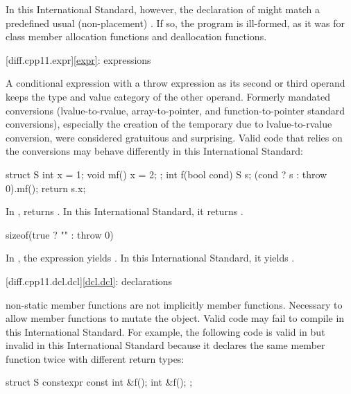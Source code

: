 In this International Standard, however, the declaration of 
might match a predefined usual (non-placement)
. If so, the
program is ill-formed, as it was for class member allocation functions and
deallocation functions.

[diff.cpp11.expr]{\ref{expr}: expressions}

\change
A conditional expression with a throw expression as its second or third
operand keeps the type and value category of the other operand.
\rationale
Formerly mandated conversions (lvalue-to-rvalue,
array-to-pointer, and function-to-pointer
standard conversions), especially the creation of the temporary due to
lvalue-to-rvalue conversion, were considered gratuitous and surprising.
\effect
Valid \CppXI{} code that relies on the conversions may behave differently
in this International Standard:

\begin{codeblock}
struct S {
  int x = 1;
  void mf() { x = 2; }
};
int f(bool cond) {
  S s;
  (cond ? s : throw 0).mf();
  return s.x;
}
\end{codeblock}

In \CppXI{},  returns . In this International Standard,
it returns .

\begin{codeblock}
sizeof(true ? "" : throw 0)
\end{codeblock}

In \CppXI{}, the expression yields . In this
International Standard, it yields .

[diff.cpp11.dcl.dcl]{\ref{dcl.dcl}: declarations}

\change
{} non-static member functions are not implicitly
 member functions.
\rationale
Necessary to allow  member functions to mutate
the object.
\effect
Valid \CppXI{} code may fail to compile in this International Standard.
For example, the following code is valid in \CppXI{}
but invalid in this International Standard because it declares the same member
function twice with different return types:

\begin{codeblock}
struct S {
  constexpr const int &f();
  int &f();
};
\end{codeblock}

